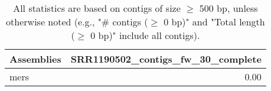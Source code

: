\documentclass[12pt,a4paper]{article}
\begin{document}
\begin{table}[ht]
\begin{center}
\caption{All statistics are based on contigs of size $\geq$ 500 bp, unless otherwise noted (e.g., "\# contigs ($\geq$ 0 bp)" and "Total length ($\geq$ 0 bp)" include all contigs).}
\begin{tabular}{|l*{1}{|r}|}
\hline
Assemblies & SRR1190502\_contigs\_fw\_30\_complete \\ \hline
mers & 0.00 \\ \hline
\end{tabular}
\end{center}
\end{table}
\end{document}
